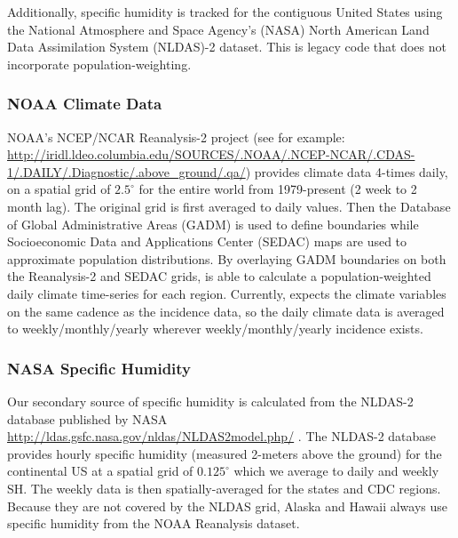\documentclass[a4paper]{article}
\begin{document}
Additionally, specific humidity is tracked for the contiguous United States using the National Atmosphere and Space Agency's (NASA) North American Land Data Assimilation System (NLDAS)-2 dataset. This is legacy code that does not incorporate population-weighting.

\subsubsection{NOAA Climate Data}
NOAA's NCEP/NCAR Reanalysis-2 project \cite{kalnay1996ncep} (see for example: \url{http://iridl.ldeo.columbia.edu/SOURCES/.NOAA/.NCEP-NCAR/.CDAS-1/.DAILY/.Diagnostic/.above_ground/.qa/}) provides climate data 4-times daily, on a spatial grid of $2.5^{\circ}$ for the entire world from 1979-present (2 week to 2 month lag).  The original grid is first averaged to daily values.  Then the Database of Global Administrative Areas (GADM) is used to define boundaries while Socioeconomic Data and Applications Center (SEDAC) maps are used to approximate population distributions.  By overlaying GADM boundaries on both the Reanalysis-2 and SEDAC grids,  is able to calculate a population-weighted daily climate time-series for each region.  Currently,  expects the climate variables on the same cadence as the incidence data, so the daily climate data is averaged to weekly/monthly/yearly wherever weekly/monthly/yearly incidence exists.

\subsubsection{NASA Specific Humidity}
Our secondary source of specific humidity is calculated from the NLDAS-2 database published by NASA \url{http://ldas.gsfc.nasa.gov/nldas/NLDAS2model.php/} \cite{xia2012continental,mitchell2004multi}. The NLDAS-2 database provides hourly specific humidity (measured 2-meters above the ground) for the continental US at a spatial grid of $0.125^{\circ}$ which we average to daily and weekly SH. The weekly data is then spatially-averaged for the states and CDC regions.  Because they are not covered by the NLDAS grid, Alaska and Hawaii always use specific humidity from the NOAA Reanalysis dataset.
\end{document}
